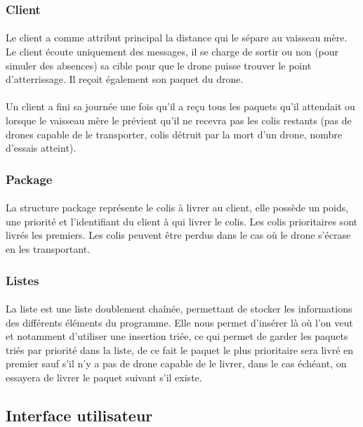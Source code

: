 \documentclass[article, backcover, french, nodocumentinfo]{upmethodology-document}
\begin{document}
			\subsubsection{Client}
				\paragraph*{}
					Le client a comme attribut principal la distance qui le sépare au vaisseau mère. Le client écoute uniquement des messages, il se charge de sortir ou non (pour simuler des absences) sa cible pour que le drone puisse trouver le point d’atterrissage. Il reçoit également son paquet du drone.
				\paragraph*{}
					Un client a fini sa journée une fois qu'il a reçu tous les paquets qu'il attendait ou lorsque le vaisseau mère le prévient qu'il ne recevra pas les colis restants (pas de drones capable de le transporter, colis détruit par la mort d'un drone, nombre d'essais atteint).
			\subsubsection{Package}
				\paragraph*{}
					La structure package représente le colis à livrer au client, elle possède un poids, une priorité et l'identifiant du client à qui livrer le colis. Les colis prioritaires sont livrés les premiers. Les colis peuvent être perdus dans le cas où le drone s'écrase en les transportant.
			\subsubsection{Listes}
				\paragraph*{}
					La liste est une liste doublement chaînée, permettant de stocker les informations des différents éléments du programme. Elle nous permet d'insérer là où l'on veut et notamment d'utiliser une insertion triée, ce qui permet de garder les paquets triés par priorité dans la liste, de ce fait le paquet le plus prioritaire sera livré en premier sauf s'il n'y a pas de drone capable de le livrer, dans le cas échéant, on essayera de livrer le paquet suivant s'il existe.
		\subsection{Interface utilisateur}
\end{document}
